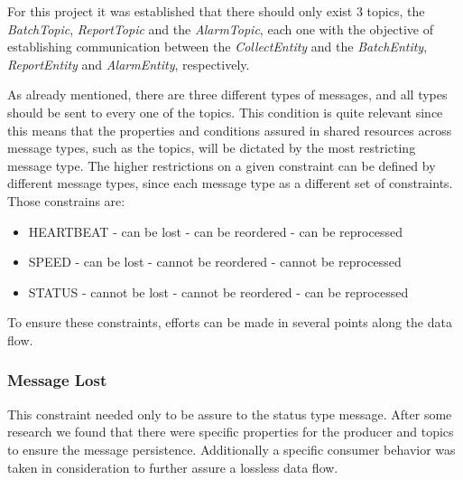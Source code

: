 \documentclass[12pt]{article}
\begin{document}
For this project it was established that there should only exist 3 topics, the \textit{BatchTopic}, \textit{ReportTopic} and the \textit{AlarmTopic}, each one with the objective of establishing communication between the \textit{CollectEntity} and the \textit{BatchEntity}, \textit{ReportEntity} and \textit{AlarmEntity}, respectively.

As already mentioned, there are three different types of messages, and all types should be sent to every one of the topics. This condition is quite relevant since this means that the properties and conditions assured in shared resources across message types, such as the topics, will be dictated by the most restricting message type. The higher restrictions on a given constraint can be defined by different message types, since each message type as a different set of constraints. Those constrains are:

\begin{multicols}{3}
  \begin{itemize}
    \item HEARTBEAT
    \newline - can be lost
    \newline - can be reordered
    \newline - can be reprocessed
  \end{itemize}

  \columnbreak

  \begin{itemize}
    \item SPEED
    \newline - can be lost
    \newline - cannot be reordered
    \newline - cannot be reprocessed
  \end{itemize}

  \columnbreak

  \begin{itemize}
    \item STATUS
    \newline - cannot be lost
    \newline - cannot be reordered
    \newline - can be reprocessed
  \end{itemize}
\end{multicols}

To ensure these constraints, efforts can be made in several points along the data flow.

\subsubsection{Message Lost}\label{lost}
This constraint needed only to be assure to the status type message. After some research we found that there were specific properties for the producer and topics to ensure the message persistence. Additionally a specific consumer behavior was taken in consideration to further assure a lossless data flow.
\end{document}
